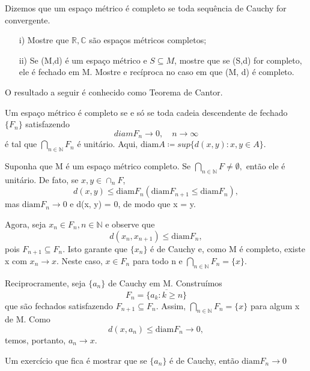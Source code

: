 \documentclass[ComplexAnalysis/complex.tex]{subfiles}
\begin{document}
Dizemos que um espaço métrico é completo se toda sequência de Cauchy for convergente.
\begin{exer*}
	\begin{itemize}
		\item[i)] Mostre que $\mathbb{R}, \mathbb{C}$ são espaços métricos completos;
		\item[ii)] Se (M,d) é um espaço métrico e $S\subseteq{M}$, mostre que se (S,d) for completo, ele é fechado em M.
		      Mostre e recíproca no caso em que (M, d) é completo.
	\end{itemize}
\end{exer*}
O resultado a seguir é conhecido como Teorema de Cantor.
\begin{theorem*}
	Um espaço métrico é completo se e só se toda cadeia descendente de fechado $\{F_{n}\} $ satisfazendo
	$$
		diam F_{n}\to{0}, \quad n\to\infty
	$$
	é tal que $\bigcap_{n\in \mathbb{N}}F_{n}$ é unitário. Aqui, $\mathrm{diam} A\coloneqq sup\{d(x, y): x, y\in{A}\}.$
\end{theorem*}
\begin{proof*}
	Suponha que M é um espaço métrico completo. Se $\bigcap\limits _{n\in \mathbb{N}}F\neq\emptyset,$ então ele é unitário.
	De fato, se $x, y\in{\cap_n{F}}$,
	$$
		d(x, y)\leq \mathrm{diam} F _{n} (\mathrm{diam} F _{n+1}\leq \mathrm{diam} F _{n}),
	$$
	mas $\mathrm{diam} F _{n}\to{0}$ e d(x, y) = 0, de modo que x = y.

	Agora, seja $x _{n}\in F _{n}, n\in \mathbb{N}$ e observe que
	$$
		d(x _{n}, x _{n+1})\leq \mathrm{diam} F _{n},
	$$
	pois $F _{n+1}\subseteq{F _{n}}$. Isto garante que $\{x_{n}\}$ é de Cauchy e, como M é completo, existe x com $x_{n}\to{x}$.
	Neste caso, $x\in{F_{n}}$ para todo n e $\bigcap _{n\in \mathbb{N}}F_{n}=\{x\}.$

	Reciprocramente, seja $\{a_{n}\}$ de Cauchy em M. Construímos
	$$
		F_{n} = \overline{\{a_{k}: k\geq{n}\}}
	$$
	que são fechados satisfazendo $F_{n+1}\subseteq{F_{n}}.$ Assim, $\bigcap\limits _{n\in \mathbb{N}}F_{n} = \{x\}$ para algum
	x de M. Como
	$$
		d(x, a_{n})\leq \mathrm{diam}F_{n}\to{0},
	$$
	temos, portanto, $a_{n}\to{x}.$
	\qedsymbol
\end{proof*}
Um exercício que fica é mostrar que se $\{a_{n}\}$ é de Cauchy, então $\mathrm{diam}F_{n}\to{0}$
\end{document}
